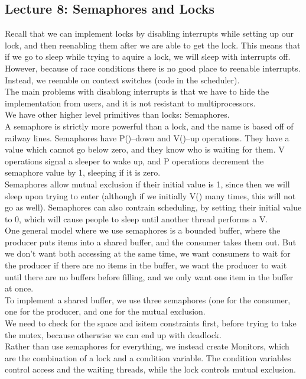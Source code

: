 \documentclass[paper=a4, fontsize=11pt]{scrartcl} %
\numberwithin{equation}{section} %
\numberwithin{figure}{section} %
\numberwithin{table}{section} %
\begin{document}
\subsection{Lecture 8: Semaphores and Locks}
Recall that we can implement locks by disabling interrupts while setting up our lock, and then reenabling them after we are able to get the lock. This means that if we go to sleep while trying to aquire a lock, we will sleep with interrupts off. However, because of race conditions there is no good place to reenable interrupts. Instead, we reenable on context switches (code in the scheduler). \\
The main problems with disablong interrupts is that we have to hide the implementation from users, and it is not resistant to multiprocessors. \\
We have other higher level primitives than locks: Semaphores. \\
A semaphore is strictly more powerful than a lock, and the name is based off of railway lines. Semaphores have P()--down and V()--up operations. They have a value which cannot go below zero, and they know who is waiting for them. V operations signal a sleeper to wake up, and P operations decrement the semaphore value by 1, sleeping if it is zero. \\
Semaphores allow mutual exclusion if their initial value is 1, since then we will sleep upon trying to enter (although if we initially V() many times, this will not go as well). Semaphores can also contrain scheduling, by setting their initial value to 0, which will cause people to sleep until another thread performs a V. \\
One general model where we use semaphores is a bounded buffer, where the producer puts items into a shared buffer, and the consumer takes them out. But we don't want both accessing at the same time, we want consumers to wait for the producer if there are no items in the buffer, we want the producer to wait until there are no buffers before filling, and we only want one item in the buffer at once. \\
To implement a shared buffer, we use three semaphores (one for the consumer, one for the producer, and one for the mutual exclusion. \\
We need to check for the space and isitem constraints first, before trying to take the mutex, because otherwise we can end up with deadlock. \\
Rather than use semaphores for everything, we instead create Monitors, which are the combination of a lock and a condition variable. The condition variables control access and the waiting threads, while the lock controls mutual exclusion.\\
\end{document}
